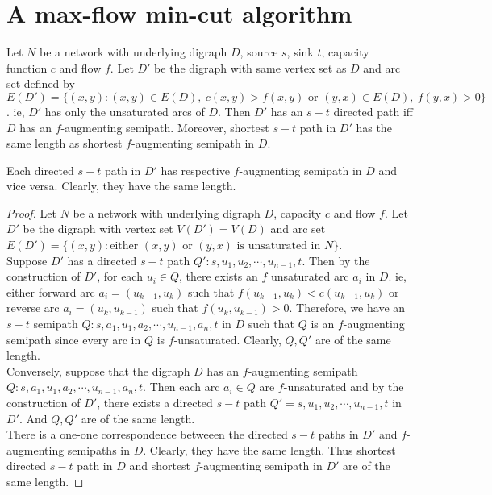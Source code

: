 \section{A max-flow min-cut algorithm}
\begin{theorem}
	Let $N$ be a network with underlying digraph $D$, source $s$, sink $t$, capacity function $c$ and flow $f$. Let $D'$ be the digraph with same vertex set as $D$ and arc set defined by $E(D') = \{ (x,y) : (x,y) \in E(D),\ c(x,y) > f(x,y) \text{ or } (y,x) \in E(D),\ f(y,x) > 0 \}$. ie, $D'$ has only the unsaturated arcs of $D$. Then $D'$ has an $s-t$ directed path iff $D$ has an $f$-augmenting semipath. Moreover, shortest $s-t$ path in $D'$ has the same length as shortest $f$-augmenting semipath in $D$.
\end{theorem}
\begin{synopsis}
	Each directed $s-t$ path in $D'$ has respective $f$-augmenting semipath in $D$ and vice versa. Clearly, they have the same length.
\end{synopsis}
\begin{proof}
	Let $N$ be a network with underlying digraph $D$, capacity $c$ and flow $f$. Let $D'$ be the digraph with vertex set $V(D') = V(D)$ and arc set $E(D') = \{ (x,y) : \text{either }(x,y) \text{ or } (y,x) \text{ is unsaturated in } N \}$.\\

	Suppose $D'$ has a directed $s-t$ path $Q' : s,u_1,u_2,\cdots,u_{n-1},t$. Then by the construction of $D'$, for each $u_i \in Q$, there exists an $f$ unsaturated arc $a_i$ in $D$. ie, either forward arc $a_i = (u_{k-1},u_k)$ such that $f(u_{k-1},u_k) < c(u_{k-1},u_k)$ or reverse arc $a_i = (u_k,u_{k-1})$ such that $f(u_k,u_{k-1}) > 0$. Therefore, we have an $s-t$ semipath $Q : s,a_1,u_1,a_2,\cdots,u_{n-1},a_n,t$ in $D$ such that $Q$ is an $f$-augmenting semipath since every arc in $Q$ is $f$-unsaturated. Clearly, $Q,Q'$ are of the same length.\\

	Conversely, suppose that the digraph $D$ has an $f$-augmenting semipath $Q : s,a_1,u_1,a_2,\cdots,u_{n-1},a_n,t$. Then each arc $a_i \in Q$ are $f$-unsaturated and by the construction of $D'$, there exists a directed $s-t$ path $Q' = s,u_1,u_2,\cdots,u_{n-1},t$ in $D'$. And $Q,Q'$ are of the same length.\\

	There is a one-one correspondence betweeen the directed $s-t$ paths in $D'$ and $f$-augmenting semipaths in $D$. Clearly, they have the same length. Thus shortest directed $s-t$ path in $D$ and shortest $f$-augmenting semipath in $D'$ are of the same length.
\end{proof}

